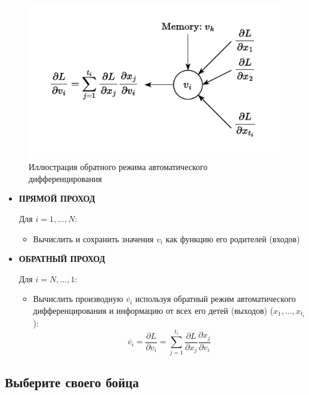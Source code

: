 \documentclass[
  russian,
  letterpaper,
  DIV=11,
  numbers=noendperiod]{scrartcl}
\providecommand{\tightlist}{%
  \setlength{\itemsep}{0pt}\setlength{\parskip}{0pt}}
\begin{document}
\begin{figure}[H]

{\centering \includegraphics[width=0.6\linewidth,height=\textheight,keepaspectratio]{auto_diff_reverse.pdf}

}

\caption{Иллюстрация обратного режима автоматического дифференцирования}

\end{figure}%

\begin{itemize}
\item
  \textbf{ПРЯМОЙ ПРОХОД}

  Для \(i = 1, \ldots, N\):

  \begin{itemize}
  \tightlist
  \item
    Вычислить и сохранить значения \(v_i\) как функцию его родителей
    (входов)
  \end{itemize}
\item
  \textbf{ОБРАТНЫЙ ПРОХОД}

  Для \(i = N, \ldots, 1\):

  \begin{itemize}
  \tightlist
  \item
    Вычислить производную \(\overline{v_i}\) используя обратный режим
    автоматического дифференцирования и информацию от всех его детей
    (выходов) (\(x_1, \ldots, x_{t_i}\)): \[
      \overline{v_i} = \dfrac{\partial L}{\partial v_i} = \sum_{j = 1}^{t_i} \dfrac{\partial L}{\partial x_j} \dfrac{\partial x_j}{\partial v_i}
      \]
  \end{itemize}
\end{itemize}

\subsection{Выберите своего
бойца}\label{ux432ux44bux431ux435ux440ux438ux442ux435-ux441ux432ux43eux435ux433ux43e-ux431ux43eux439ux446ux430}
\end{document}
